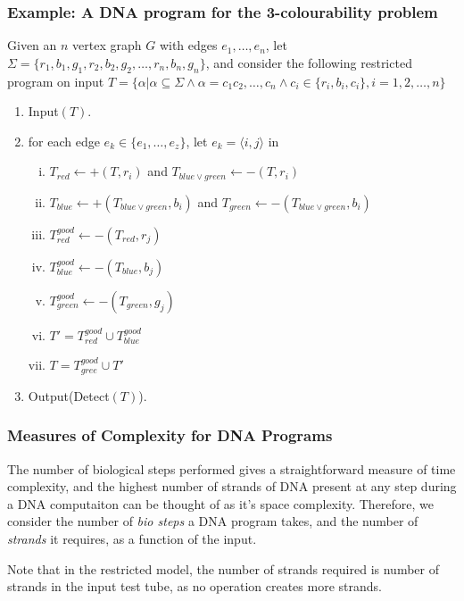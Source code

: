 \documentclass{beamer}
\begin{document}
\begin{frame}
\frametitle{Example: A DNA program for the 3-colourability problem}

Given an $n$ vertex graph $G$ with edges $e_1,\ldots,e_n$, let $\Sigma = \{r_1,b_1,g_1,r_2,b_2,g_2,\ldots,r_n,b_n,g_n\}$, and consider the following restricted program on input $T = \{\alpha | \alpha \subseteq \Sigma \wedge \alpha = c_1c_2,\ldots,c_n \wedge c_i \in \{r_i,b_i,c_i\}, i = 1,2,\ldots,n \}$

\begin{enumerate}[(1)]
\item Input$(T)$.
\item for each edge $e_k \in \{e_1,\ldots,e_z\}$, let $e_k = \langle i,j \rangle$ in
  \begin{enumerate}[(i)]
  \item $T_{red} \leftarrow +(T,r_i)$ and $T_{blue \vee green} \leftarrow -(T,r_i)$
  \item $T_{blue} \leftarrow +(T_{blue \vee green},b_i)$ and $T_{green} \leftarrow -(T_{blue \vee green},b_i)$
  \item $T_{red}^{good} \leftarrow -(T_{red},r_j)$
  \item $T_{blue}^{good} \leftarrow -(T_{blue},b_j)$
  \item $T_{green}^{good} \leftarrow -(T_{green},g_j)$
  \item $T' = T_{red}^{good} \cup T_{blue}^{good}$
  \item $T = T_{gree}^{good} \cup T'$
  \end{enumerate}
\item Output(Detect$(T)$).
\end{enumerate}
\end{frame}

\begin{frame}
\frametitle{Measures of Complexity for DNA Programs}

The number of biological steps performed gives a straightforward measure of time complexity, and the highest number of strands of DNA present at any step during a DNA computaiton can be thought of as it's space complexity. Therefore, we consider the number of \emph{bio steps} a DNA program takes, and the number of \emph{strands} it requires, as a function of the input.

Note that in the restricted model, the number of strands required is number of strands in the input test tube, as no operation creates more strands.
\end{frame}
\end{document}
